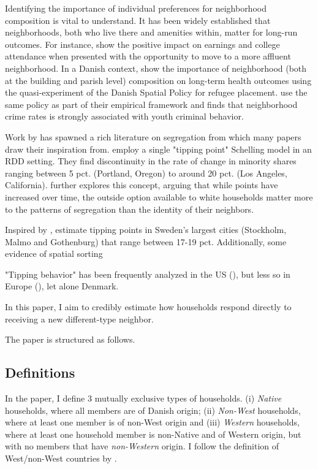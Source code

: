 \documentclass[../main.tex]{subfiles}
\begin{document}
Identifying the importance of individual preferences for neighborhood composition is vital to understand. It has been widely established that neighborhoods, both who live there and amenities within, matter for long-run outcomes. For instance, \textcite{chetty2016effects} show the positive impact on earnings and college attendance when presented with the opportunity to move to a more affluent neighborhood. In a Danish context, \textcite{hasager2024sick_poor_neighborhood} show the importance of neighborhood (both at the building and parish level) composition on long-term health outcomes using the quasi-experiment of the Danish Spatial Policy for refugee placement. \textcite{damm2014crime} use the same policy as part of their empirical framework and finds that neighborhood crime rates is strongly associated with youth criminal behavior.  

Work by \textcite{schelling1971dynamic} has spawned a rich literature on segregation from which many papers draw their inspiration from.  \textcite{card2008tipping} employ a single "tipping point" Schelling model in an RDD setting. They find discontinuity in the rate of change in minority shares ranging between 5 pct. (Portland, Oregon) to around 20 pct. (Los Angeles, California). \textcite{blair2017outside} further explores this concept, arguing that while points have increased over time, the outside option available to white households matter more to the patterns of segregation than the identity of their neighbors.

Inspired by \textcite{card2008tipping},\textcite{bohlmark_willen_2020_tipping} estimate tipping points in Sweden's largest cities (Stockholm, Malmo and Gothenburg) that range between 17-19 pct. Additionally, some evidence of spatial sorting \textcite{}


"Tipping behavior" has been frequently analyzed in the US (\textcite{Ananat_2011, davis2018long, chetty2015impacts}), but less so in Europe (\textcite{bohlmark_willen_2020_tipping}), let alone Denmark. 

In this paper, I aim to credibly estimate how households respond directly to receiving a new different-type neighbor.


The paper is structured as follows. 

\subsection{Definitions}
\label{sec:intro_definitions}
In the paper, I define 3 mutually exclusive types of households. (i) \textit{Native} households, where all members are of Danish origin; (ii) \textit{Non-West} households, where at least one member is of non-West origin and (iii) \textit{Western} households, where at least one household member is non-Native and of Western origin, but with no members that have \textit{non-Western} origin. I follow the definition of West/non-West countries by \textcite{west_non_west_def_dst}.
\end{document}
